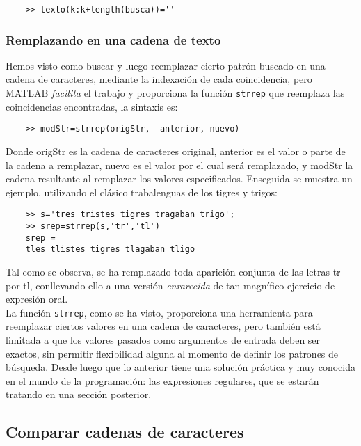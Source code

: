 \begin{verbatim}
	>> texto(k:k+length(busca))=''
\end{verbatim}

\subsubsection{Remplazando en una cadena de texto}

Hemos visto como buscar y luego reemplazar cierto patrón buscado en una cadena de caracteres, 
mediante la indexación de cada coincidencia, pero MATLAB \textit{facilita} el trabajo y 
proporciona la función \texttt{strrep} que reemplaza las coincidencias encontradas, la sintaxis es:

\begin{verbatim}
	>> modStr=strrep(origStr,  anterior, nuevo)
\end{verbatim}

Donde origStr es la cadena de caracteres original, anterior es el valor o parte de la cadena a 
remplazar, nuevo es el valor por el cual será remplazado, y modStr la cadena resultante al 
remplazar los valores especificados. Enseguida se muestra un ejemplo, utilizando el clásico 
trabalenguas de los tigres y trigos:

\begin{verbatim}
	>> s='tres tristes tigres tragaban trigo';
	>> srep=strrep(s,'tr','tl')
	srep =
	tles tlistes tigres tlagaban tligo
\end{verbatim}

Tal como se observa, se ha remplazado toda aparición conjunta de las letras tr por tl, conllevando 
ello a una versión \textit{enrarecida} de tan magnífico ejercicio de expresión oral.\\

La función \texttt{strrep}, como se ha visto, proporciona una herramienta para reemplazar ciertos 
valores en una cadena de caracteres, pero también está limitada a que los valores pasados como 
argumentos de entrada deben ser exactos, sin permitir flexibilidad alguna al momento de definir 
los patrones de búsqueda. Desde luego que lo anterior tiene una solución práctica y muy conocida 
en el mundo de la programación: las expresiones regulares, que se estarán tratando en una sección posterior.

\subsection{Comparar cadenas de caracteres}

